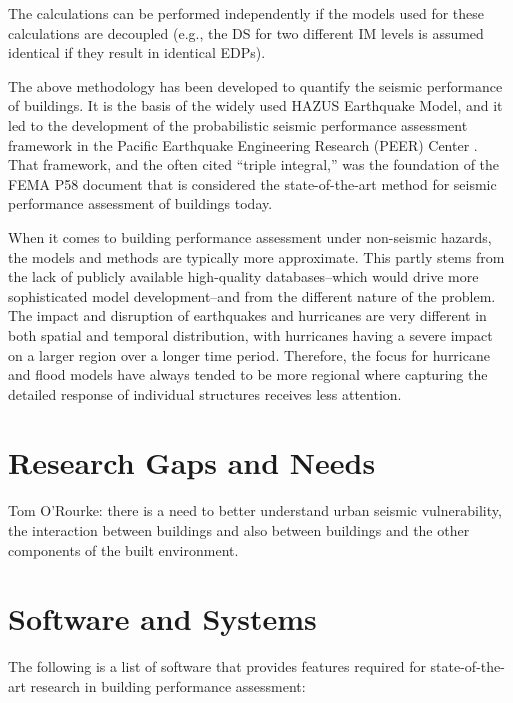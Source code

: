 The calculations can be performed independently if the models used for these calculations are decoupled (e.g., the DS for two different IM levels is assumed identical if they result in identical EDPs).

The above methodology has been developed to quantify the seismic performance of buildings. It is the basis of the widely used HAZUS Earthquake Model, and it led to the development of the probabilistic seismic performance assessment framework in the Pacific Earthquake Engineering Research (PEER) Center \citep{porter2001assemblybased}. That framework, and the often cited ``triple integral,'' was the foundation of the FEMA P58 document that is considered the state-of-the-art method for seismic performance assessment of buildings today.

When it comes to building performance assessment under non-seismic hazards, the models and methods are typically more approximate. This partly stems from the lack of publicly available high-quality databases--which would drive more sophisticated model development--and from the different nature of the problem. The impact and disruption of earthquakes and hurricanes are very different in both spatial and temporal distribution, with hurricanes having a severe impact on a larger region over a longer time period. Therefore, the focus for hurricane and flood models have always tended to be more regional where capturing the detailed response of individual structures receives less attention.

\section{Research Gaps and Needs}
\label{sec:perf_bldg_gaps}

Tom O'Rourke: there is a need to better understand urban seismic vulnerability, the interaction between buildings and also between buildings and the other components of the built environment.

\section{Software and Systems}
\label{sec:perf_bldg_tools}

The following is a list of software that provides features required for state-of-the-art research in building performance assessment:

